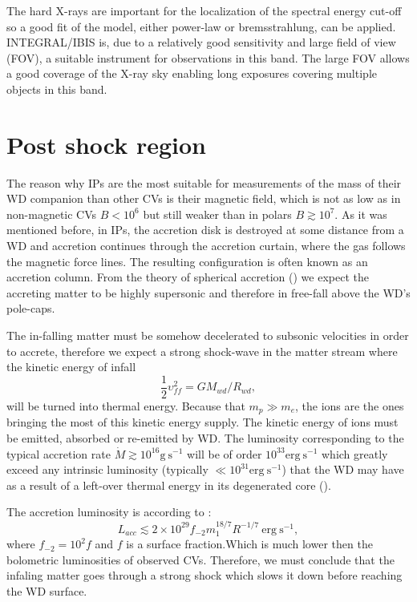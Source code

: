 \documentclass[oneside,a4paper,11pt]{report}
\begin{document}
The hard X-rays are important for the localization of the spectral energy cut-off so a good fit 
of the model, either power-law or bremsstrahlung, can be applied. INTEGRAL/IBIS is, 
due to a relatively good sensitivity and large field of view (FOV), a suitable instrument 
for observations in this band. The large FOV allows a good coverage 
of the X-ray sky enabling long exposures covering multiple objects in this band.  

\section{Post shock region}
The reason why IPs are the most suitable for measurements of the mass of their WD companion than other CVs 
is their magnetic field, which is not as low as in non-magnetic CVs $B<10^6$ but still weaker than in 
polars $B\gtrsim10^7$. 
As it was mentioned before, in IPs, the accretion disk is destroyed at some distance from a WD and accretion 
continues through the accretion curtain, where the gas follows the magnetic force lines. 
The resulting configuration is often known as an accretion column. 
From the theory of spherical accretion (\citet{accpower:1}) we expect the accreting matter to be highly 
supersonic and therefore in free-fall above the WD's pole-caps. 

The in-falling matter must be somehow decelerated to subsonic velocities in order to accrete, 
therefore we expect a strong shock-wave in the matter stream where the kinetic energy of infall 
\begin{equation}
\frac{1}{2}\upsilon_{ff}^2 = GM_{wd}/R_{wd}, 
\end{equation}
will be turned into thermal energy. Because that $m_p \gg m_e$, the ions are the ones bringing the most of this kinetic energy supply. 
The kinetic energy of ions must be emitted, absorbed or re-emitted by WD. The luminosity corresponding 
to the typical accretion rate $\dot{M} \gtrsim 10^{16} \mathrm{g\:s^{-1}}$ will be of order 
$10^{33} \mathrm{erg\:s^{-1}}$ which greatly exceed any intrinsic luminosity (typically 
$\ll 10^{31} \mathrm{erg\:s^{-1}}$) that the WD may have as a result of a left-over thermal energy in its 
degenerated core (\citet{accpower:1}).  

The accretion luminosity is according to \citet{accpower:1}:
\begin{equation}
\label{lacc}
L_{acc} \lesssim 2 \times 10^{29}f_{-2}m_1^{18/7}R^{-1/7} \: \mathrm{erg \: s^{-1}},
\end{equation}
where $f_{-2} = 10^2 f$ and $f$ is a surface fraction.Which is much lower then the bolometric luminosities 
of observed CVs. Therefore, we must conclude that the infaling matter goes through a strong shock which 
slows it down before reaching the WD surface.    
\end{document}
